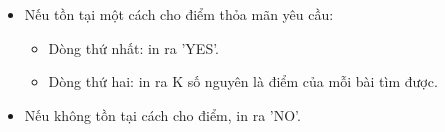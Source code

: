 \begin{itemize}
	\item Nếu tồn tại một cách cho điểm thỏa mãn yêu cầu:
\begin{itemize}
	\item Dòng thứ nhất: in ra 'YES'.
	\item Dòng thứ hai: in ra K số nguyên là điểm của mỗi bài tìm được.
\end{itemize}
	\item Nếu không tồn tại cách cho điểm, in ra 'NO'.
\end{itemize}

\